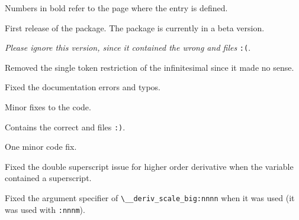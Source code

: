 	
	\clearpage
	Numbers in bold  refer to the page where the entry is defined.
	
	\printindex[option]
	
	\clearpage
	
	\printindex[macro]
	
	\clearpage
	
	\setlength{\marginparwidth}{75pt}
	
	\begin{changelog}
		\begin{change}[version = 0.9,  date = 2019-07-21, beta = true]
			\item First release of the package. The package is currently in a beta version.
		\end{change}
		\bigskip
		\begin{change}[version = 0.95, date = 2019-09-18, beta = true]
			\item \emph{Please ignore this version, since it contained the wrong  and  files} \texttt{:(}.
			\item Removed the single token restriction of the infinitesimal since it made no sense.
			\item Fixed the documentation errors and typos.
			\item Minor fixes to the code.
		\end{change}
		\begin{change}[version = 0.95b, date = 2019-09-21, beta = true]
			\item Contains the correct  and  files \texttt{:)}.
			\item One minor code fix.
		\end{change}
		\begin{change}[version = 0.96, date = 2019-12-22, beta = true]
			\item Fixed the double superscript issue for higher order derivative when the variable contained a superscript.
		\end{change}
		\smallskip
		\begin{change}[version = 0.97, date = 2020-02-03, beta = true]
			\item Fixed the argument specifier of {\small\verb|\__deriv_scale_big:nnnn|} when it was used (it was used with \texttt{:nnnm}).
		\end{change}
		\smallskip
		\begin{change}[version = 0.98, date = 2020-07-20, beta = true]

\end{change}
\end{changelog}
